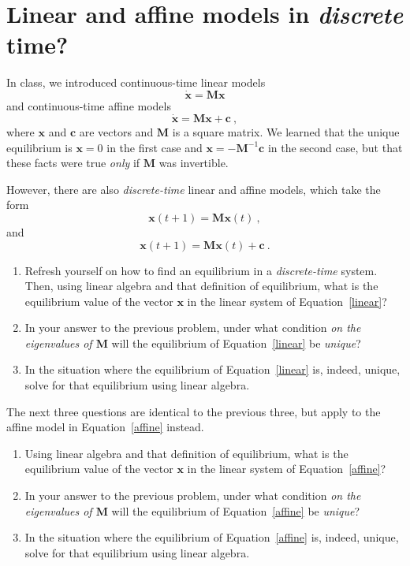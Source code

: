 \documentclass[11pt,onecolumn,superscriptaddress,notitlepage]{article}
\newcommand{\vx}[0]{\mathbf{x}}
\begin{document}
\clearpage
\section*{Linear and affine models in {\it discrete} time?} 
In class, we introduced continuous-time linear models 
$$\dot{\vx} = \mathbf{M}\vx$$
 and continuous-time affine models 
$$\dot{\vx} = \mathbf{M}\vx + \mathbf{c}\ ,$$
 where $\vx$ and $\mathbf{c}$ are vectors and $\mathbf{M}$ is a square matrix. We learned that the unique equilibrium is $\vx=0$ in the first case and $\vx=-\mathbf{M}^{-1} \mathbf{c}$ in the second case, but that these facts were true {\it only} if $\mathbf{M}$ was invertible. 
 
 
 However, there are also {\it discrete-time} linear and affine models, which take the form
 \begin{equation}
	 \vx(t+1) = \mathbf{M} \vx(t)\ ,
	 \label{linear}
 \end{equation}
and 
\begin{equation}
	\vx(t+1) = \mathbf{M} \vx(t) + \mathbf{c}\ .
	\label{affine}
\end{equation}

\vspace{0.2in}
\begin{enumerate}[resume]
	\item Refresh yourself on how to find an equilibrium in a {\it discrete-time} system. Then, using linear algebra and that definition of equilibrium, what is the equilibrium value of the vector $\mathbf{x}$ in the linear system of Equation~\eqref{linear}?
	\item In your answer to the previous problem, under what condition {\it on the eigenvalues of $\mathbf{M}$} will the equilibrium of Equation~\eqref{linear} be {\it unique}?
	\item In the situation where the equilibrium of Equation~\eqref{linear} is, indeed, unique, solve for that equilibrium using linear algebra.
\end{enumerate}

\vspace{0.2in}
The next three questions are identical to the previous three, but apply to the affine model in Equation~\eqref{affine} instead. 
\begin{enumerate}[resume]
	\item Using linear algebra and that definition of equilibrium, what is the equilibrium value of the vector $\mathbf{x}$ in the linear system of Equation~\eqref{affine}?
	\item In your answer to the previous problem, under what condition {\it on the eigenvalues of $\mathbf{M}$} will the equilibrium of Equation~\eqref{affine} be {\it unique}?
	\item In the situation where the equilibrium of Equation~\eqref{affine} is, indeed, unique, solve for that equilibrium using linear algebra.
\end{enumerate}
\end{document}
